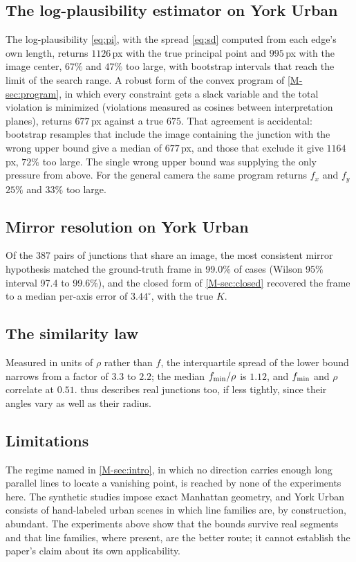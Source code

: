 \subsection{The log-plausibility estimator on York Urban}
The log-plausibility \eqref{eq:pi}, with the spread \eqref{eq:sd} computed from each edge's own length, returns $1126$\,px with the true principal point and $995$\,px with the image center, $67\%$ and $47\%$ too large, with bootstrap intervals that reach the limit of the search range. A robust form of the convex program of \cref{M-sec:program}, in which every constraint gets a slack variable and the total violation is minimized (violations measured as cosines between interpretation planes), returns $677$\,px against a true $675$. That agreement is accidental: bootstrap resamples that include the image containing the junction with the wrong upper bound give a median of $677$\,px, and those that exclude it give $1164$\,px, $72\%$ too large. The single wrong upper bound was supplying the only pressure from above. For the general camera the same program returns $f_x$ and $f_y$ $25\%$ and $33\%$ too large.

\subsection{Mirror resolution on York Urban}
 Of the 387 pairs of junctions that share an image, the most consistent mirror hypothesis matched the ground-truth frame in 99.0\% of cases (Wilson 95\% interval 97.4 to 99.6\%), and the closed form of \cref{M-sec:closed} recovered the frame to a median per-axis error of $3.44^\circ$, with the true $K$.

\subsection{The similarity law}

Measured in units of $\rho$ rather than $f$, the interquartile spread of the lower bound narrows from a factor of $3.3$ to $2.2$; the median $f_{\min}/\rho$ is $1.12$, and $f_{\min}$ and $\rho$ correlate at $0.51$.  thus describes real junctions too, if less tightly, since their angles vary as well as their radius.

\subsection{Limitations}\label{sec:proposals}\label{sec:missing}

The regime named in \cref{M-sec:intro}, in which no direction carries enough long parallel lines to locate a vanishing point, is reached by none of the experiments here. The synthetic studies impose exact Manhattan geometry, and York Urban consists of hand-labeled urban scenes in which line families are, by construction, abundant. The experiments above show that the bounds survive real segments and that line families, where present, are the better route; it cannot establish the paper's claim about its own applicability.

